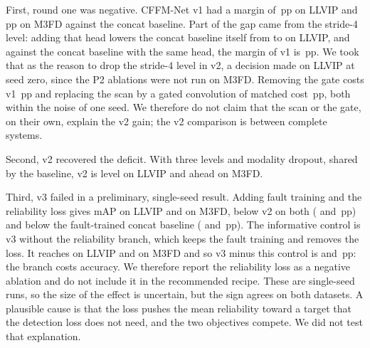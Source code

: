 First, round one was negative. CFFM-Net v1 had a margin of \marLlvipVoneVsConcatPlainSeedZeroMap{}\,pp on LLVIP and \marMfdVoneVsConcatPlainSeedZeroMap{}\,pp on M3FD against the concat baseline. Part of the gap came from the stride-4 level: adding that head lowers the concat baseline itself from \resLlvipConcatPlainSeedZeroMap{} to \resLlvipConcatPtwoSeedZeroMap{} on LLVIP, and against the concat baseline with the same head, the margin of v1 is \marLlvipVoneVsConcatPtwoSeedZeroMap{}\,pp. We took that as the reason to drop the stride-4 level in v2, a decision made on LLVIP at seed zero, since the P2 ablations were not run on M3FD. Removing the gate costs v1 \marLlvipVoneVsVoneNogateSeedZeroMap{}\,pp and replacing the scan by a gated convolution of matched cost \marLlvipVoneVsVoneGconvSeedZeroMap{}\,pp, both within the noise of one seed. We therefore do not claim that the scan or the gate, on their own, explain the v2 gain; the v2 comparison is between complete systems.

Second, v2 recovered the deficit. With three levels and modality dropout, shared by the baseline, v2 is level on LLVIP and ahead on M3FD.

Third, v3 failed in a preliminary, single-seed result. Adding fault training and the reliability loss gives \resLlvipCffmVthreeSeedZeroMap{} mAP on LLVIP and \resMfdCffmVthreeSeedZeroMap{} on M3FD, below v2 on both (\marLlvipVthreeVsVtwoSeedZeroMap{} and \marMfdVthreeVsVtwoSeedZeroMap{}\,pp) and below the fault-trained concat baseline (\marLlvipVthreeVsConcatFtSeedZeroMap{} and \marMfdVthreeVsConcatFtSeedZeroMap{}\,pp). The informative control is v3 without the reliability branch, which keeps the fault training and removes the loss. It reaches \resLlvipCffmVthreeNorelSeedZeroMap{} on LLVIP and \resMfdCffmVthreeNorelSeedZeroMap{} on M3FD and so v3 minus this control is \marLlvipVthreeVsVthreeNorelSeedZeroMap{} and \marMfdVthreeVsVthreeNorelSeedZeroMap{}\,pp: the branch costs accuracy. We therefore report the reliability loss as a negative ablation and do not include it in the recommended recipe. These are single-seed runs, so the size of the effect is uncertain, but the sign agrees on both datasets. A plausible cause is that the loss pushes the mean reliability toward a target that the detection loss does not need, and the two objectives compete. We did not test that explanation.




